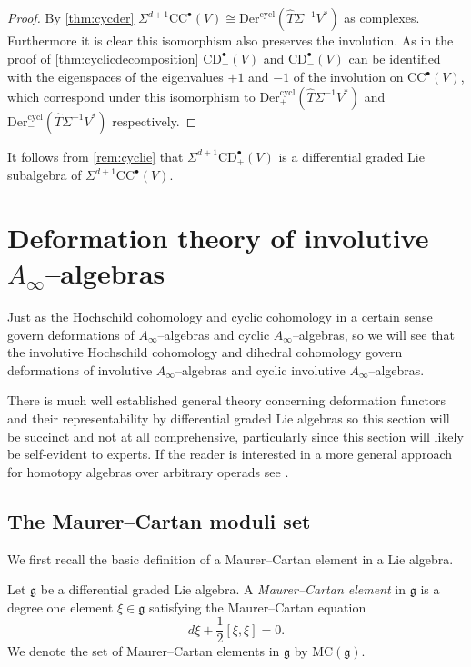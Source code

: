 \documentclass[british]{amsart}
\theoremstyle{plain}
\theoremstyle{definition}
{
\newaliascnt{{definition}}{theorem}\newtheorem{{definition}}[{definition}]{{Definition}}\aliascntresetthe{{definition}}\expandafterautorefname\endcsname{{Definition}}}
{
\newaliascnt{{remark}}{theorem}\newtheorem{{remark}}[{remark}]{{Remark}}\aliascntresetthe{{remark}}\expandafterautorefname\endcsname{{Remark}}}
{
\newaliascnt{{example}}{theorem}\newtheorem{{example}}[{example}]{{Example}}\aliascntresetthe{{example}}\expandafterautorefname\endcsname{{Example}}}
{
\newaliascnt{{examples}}{theorem}\newtheorem{{examples}}[{examples}]{{Examples}}\aliascntresetthe{{examples}}\expandafterautorefname\endcsname{{Examples}}}
{
\newaliascnt{{notation}}{theorem}\newtheorem{{notation}}[{notation}]{{Notation}}\aliascntresetthe{{notation}}\expandafterautorefname\endcsname{{Notation}}}
{
\newaliascnt{{convention}}{theorem}\newtheorem{{convention}}[{convention}]{{Convention}}\aliascntresetthe{{convention}}\expandafterautorefname\endcsname{{Convention}}}
\numberwithin{equation}{section}
\numberwithin{figure}{section}
\begin{document}
\begin{proof}
By \autoref{thm:cycder} $\Sigma^{d+1} {\mathrm{CC}}^\bullet(V) \cong {\mathrm{Der}}^{\mathrm{cycl}}(\widehat{T}\Sigma^{-1}V^*)$ as complexes. Furthermore it is clear this isomorphism also preserves the involution. As in the proof of \autoref{thm:cyclicdecomposition} ${\mathrm{CD}}^\bullet_+(V)$ and ${\mathrm{CD}}^\bullet_-(V)$ can be identified with the eigenspaces of the eigenvalues $+1$ and $-1$ of the involution on ${\mathrm{CC}}^\bullet(V)$, which correspond under this isomorphism to ${\mathrm{Der}}^{\mathrm{cycl}}_+(\widehat{T}\Sigma^{-1}V^*)$ and ${\mathrm{Der}}^{\mathrm{cycl}}_-(\widehat{T}\Sigma^{-1}V^*)$ respectively.
\end{proof}

\begin{remark}
It follows from \autoref{rem:cyclie} that $\Sigma^{d+1}{\mathrm{CD}}^\bullet_+(V)$ is a differential graded Lie subalgebra of $\Sigma^{d+1}{\mathrm{CC}}^\bullet(V)$.
\end{remark}

\section{Deformation theory of involutive \texorpdfstring{$A_\infty$--}{A-infinity }algebras}\label{sec:deftheory}
Just as the Hochschild cohomology and cyclic cohomology in a certain sense govern deformations of $A_\infty$--algebras and cyclic $A_\infty$--algebras, so we will see that the involutive Hochschild cohomology and dihedral cohomology govern deformations of involutive $A_\infty$--algebras and cyclic involutive $A_\infty$--algebras.

There is much well established general theory concerning deformation functors and their representability by differential graded Lie algebras so this section will be succinct and not at all comprehensive, particularly since this section will likely be self-evident to experts. If the reader is interested in a more general approach for homotopy algebras over arbitrary operads see \cite{hinich2004:deformationsofhomalgs,hinich1997:homalg}.

\subsection{The Maurer--Cartan moduli set}
We first recall the basic definition of a Maurer--Cartan element in a Lie algebra.

\begin{definition}
Let $\mathfrak{g}$ be a differential graded Lie algebra. A \emph{Maurer--Cartan element} in $\mathfrak{g}$ is a degree one element $\xi\in\mathfrak{g}$ satisfying the Maurer--Cartan equation
\[
d\xi + \frac{1}{2}[\xi, \xi]=0.
\]
We denote the set of Maurer--Cartan elements in $\mathfrak{g}$ by ${\mathrm{MC}}(\mathfrak{g})$.
\end{definition}
\end{document}
